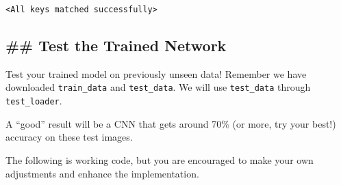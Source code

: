 \documentclass[11pt]{article}
\makeatletter
\newcommand{\boxspacing}{\kern\kvtcb@left@rule\kern\kvtcb@boxsep}
\newcommand{\prompt}[4]{
        {\ttfamily\llap{{\color{#2}[#3]:\hspace{3pt}#4}}\vspace{-\baselineskip}}
    }
\makeatother
\begin{document}
            \begin{tcolorbox}[breakable, size=fbox, boxrule=.5pt, pad at break*=1mm, opacityfill=0]
\prompt{Out}{outcolor}{9}{\boxspacing}
\begin{Verbatim}[commandchars=\\\{\}]
<All keys matched successfully>
\end{Verbatim}
\end{tcolorbox}
        
    \subsection{\#\# Test the Trained
Network}\label{test-the-trained-network}

Test your trained model on previously unseen data! Remember we have
downloaded \texttt{train\_data} and \texttt{test\_data}. We will use
\texttt{test\_data} through \texttt{test\_loader}.

A ``good'' result will be a CNN that gets around 70\% (or more, try your
best!) accuracy on these test images.

The following is working code, but you are encouraged to make your own
adjustments and enhance the implementation.
\end{document}
